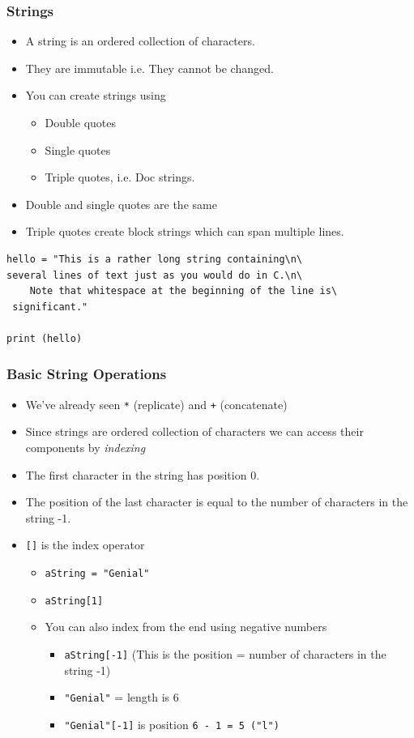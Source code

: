 \documentclass{beamer}
\begin{document}
\begin{frame}[containsverbatim]
\frametitle{Strings}
\begin{itemize}
\item A string is an ordered collection of characters.
\item They are immutable i.e. They cannot be changed.
\item You can create strings using 
\begin{itemize}
\item Double quotes
\item Single quotes 
\item Triple quotes, i.e. Doc strings.
\end{itemize}
\item Double and single quotes are the same
\item Triple quotes create block strings which can span multiple lines.
\end{itemize}
\begin{lstlisting}
hello = "This is a rather long string containing\n\
several lines of text just as you would do in C.\n\
    Note that whitespace at the beginning of the line is\
 significant."

print (hello)
\end{lstlisting}
\end{frame}
 
\begin{frame}
\frametitle{Basic String Operations}
\begin{itemize}
\item We've already seen \texttt{*} (replicate) and \texttt{+} (concatenate)
\item Since strings are ordered collection of characters we can access their components by {\em indexing}
\item The first character in the string has position 0.
\item The position of the last character is equal to the number of characters in the string -1.
\item \texttt{[]} is the index operator
\begin{itemize}
\item \texttt{aString = "Genial"}
\item \texttt{aString[1]}
\item  You can also index from the end using negative numbers
\begin{itemize}
\item \texttt{aString[-1]} (This is the position = number of characters in the string -1)
\item \texttt{"Genial"} = length is 6
\item \texttt{"Genial"[-1]} is position \texttt{6 - 1 = 5 ("l")}
\end{itemize}
\end{itemize}
\end{itemize}
\end{frame}
\end{document}
